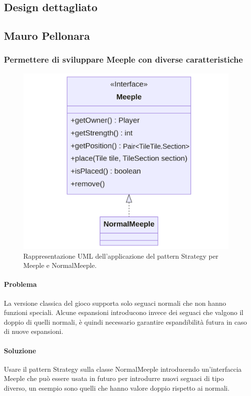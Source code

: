 \subsection{Design dettagliato}
\subsection*{Mauro Pellonara}

\subsubsection*{Permettere di sviluppare Meeple con diverse caratteristiche}
\begin{figure}[ht]
    \centering\includegraphics[scale=.25]{images/meeple.png}
    \caption{Rappresentazione UML dell'applicazione del pattern Strategy per Meeple e NormalMeeple.}
\end{figure}
\paragraph{Problema}
La versione classica del gioco supporta solo seguaci normali che non hanno funzioni speciali. Alcune espansioni introducono invece dei seguaci che valgono il doppio di quelli normali, è quindi necessario garantire espandibilità futura in caso di nuove espansioni.
\paragraph{Soluzione}
Usare il pattern Strategy sulla classe NormalMeeple introducendo un'interfaccia Meeple che può essere usata in futuro per introdurre nuovi seguaci di tipo diverso, un esempio sono quelli che hanno valore doppio rispetto ai normali.
\clearpage

